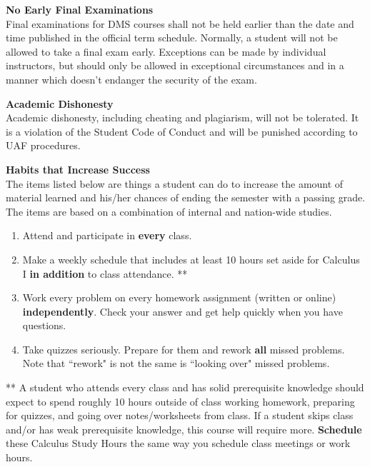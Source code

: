 \documentclass[12pt]{article}
\renewcommand{\emph}[1]{\textsf{\textbf{#1}}}
\newcommand{\localhead}[1]{\par\smallskip\textbf{#1}\nobreak\\}%
\def\heading#1{\localhead{\large\emph{#1}}}
\def\subheading#1{\localhead{\emph{#1}}}
\begin{document}
\subheading{No Early Final Examinations}
Final examinations for DMS courses shall not be held earlier than the date and time published in the official term schedule. Normally, a student will not be allowed to take a final exam early. Exceptions can be made by individual instructors, but should only be allowed in exceptional circumstances and in a manner which doesn't endanger the security of the exam.

\subheading{Academic Dishonesty}
Academic dishonesty, including cheating and plagiarism, will not be tolerated.  It is a violation of the Student Code of Conduct and will be punished according to UAF procedures.

\heading{Habits that Increase Success}
The items listed below are things a student can do to increase the amount of material learned and his/her chances of ending the semester with a passing grade. The items are based on a combination of internal and nation-wide studies.
\begin{enumerate}
\item Attend and participate in {\emph{every}} class. 
\item Make a weekly schedule that includes at least 10 hours set aside for Calculus I \emph{in addition} to class attendance. **
\item Work every problem on every homework assignment (written or online) \textbf{independently}. Check your answer and get help quickly when you have questions.
\item Take quizzes seriously. Prepare for them and rework \emph{all} missed problems. Note that  ``rework" is not the same is ``looking over" missed problems.   \end{enumerate}
** A student who attends every class and has solid prerequisite knowledge should expect to spend roughly 10 hours outside of class working homework, preparing for quizzes, and going over notes/worksheets from class. If a student skips class and/or has weak prerequisite knowledge, this course will require more. \textbf{Schedule} these Calculus Study Hours the same way you schedule class meetings or work hours.
\end{document}
